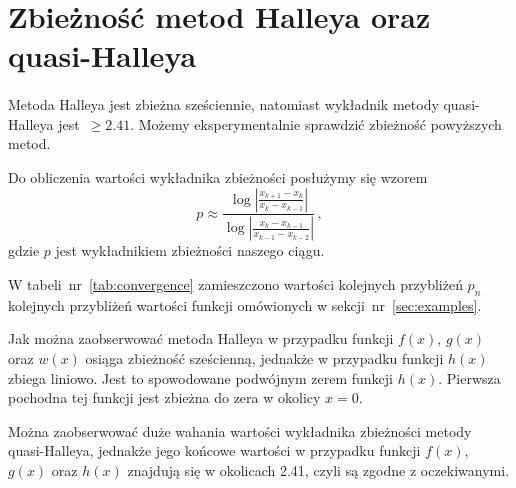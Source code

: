 \documentclass{article}
\begin{document}
\begin{table}[!htb]
\begin{subtable}{\linewidth}
\begin{tabular}{|l|l|l|l|}
          \hline
        \end{tabular}
      \end{subtable}
    \end{table}

  \section{Zbieżność metod Halleya oraz quasi-Halleya}

    \paragraph{}Metoda Halleya jest zbieżna sześciennie, natomiast wykładnik metody
    quasi-Halleya jest~$\ge 2.41$\cite{israel}. Możemy eksperymentalnie sprawdzić zbieżność powyższych
    metod.

    Do obliczenia wartości wykładnika zbieżności posłużymy się wzorem
    \begin{equation*}
      p \approx \frac{\log|\frac{x_{k+1} - x_k}{x_k - x_{k-1}}|}{\log|\frac{x_k - x_{k-1}}{x_{k-1} - x_{k-2}}|} \,,
    \end{equation*}
    gdzie $p$ jest wykładnikiem zbieżności naszego ciągu.

    W tabeli~nr~\ref{tab:convergence} zamieszczono wartości kolejnych przybliżeń $p_n$
    kolejnych przybliżeń wartości funkcji omówionych w sekcji~nr~\ref{sec:examples}.

    Jak można zaobserwować metoda Halleya w przypadku funkcji $f(x)$, $g(x)$ oraz $w(x)$
    osiąga zbieżność sześcienną, jednakże w przypadku funkcji $h(x)$ zbiega liniowo.
    Jest to spowodowane podwójnym zerem funkcji $h(x)$. Pierwsza pochodna tej funkcji
    jest zbieżna do zera w okolicy $x = 0$.

    Można zaobserwować duże wahania wartości wykładnika zbieżności metody quasi-Halleya,
    jednakże jego końcowe wartości w przypadku funkcji $f(x)$, $g(x)$ oraz $h(x)$
    znajdują się w okolicach 2.41, czyli są zgodne z oczekiwanymi.
\end{document}
